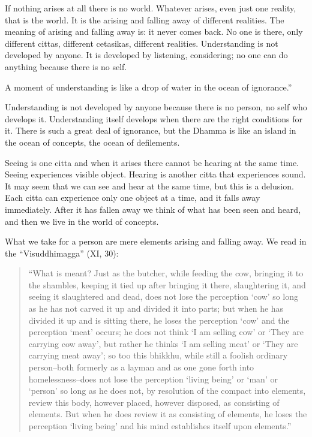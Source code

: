 If nothing arises at all there is no world. Whatever arises, even just
one reality, that is the world. It is the arising and falling away of
different realities. The meaning of arising and falling away is: it
never comes back. No one is there, only different cittas, different
cetasikas, different realities. Understanding is not developed by
anyone. It is developed by listening, considering; no one can do
anything because there is no self.

A moment of understanding is like a drop of water in the ocean of
ignorance.''

Understanding is not developed by anyone because there is no person, no
self who develops it. Understanding itself develops when there are the
right conditions for it. There is such a great deal of ignorance, but
the Dhamma is like an island in the ocean of concepts, the ocean of
defilements.

Seeing is one citta and when it arises there cannot be hearing at the
same time. Seeing experiences visible object. Hearing is another citta
that experiences sound. It may seem that we can see and hear at the same
time, but this is a delusion. Each citta can experience only one object
at a time, and it falls away immediately. After it has fallen away we
think of what has been seen and heard, and then we live in the world of
concepts.

What we take for a person are mere elements arising and falling away. We
read in the ``Visuddhimagga'' (XI, 30):

\begin{quote}

``What is meant? Just as the butcher, while feeding the cow, bringing it
to the shambles, keeping it tied up after bringing it there,
slaughtering it, and seeing it slaughtered and dead, does not lose the
perception `cow' so long as he has not carved it up and divided it into
parts; but when he has divided it up and is sitting there, he loses the
perception `cow' and the perception `meat' occurs; he does not think `I
am selling cow' or `They are carrying cow away', but rather he thinks `I
am selling meat' or `They are carrying meat away'; so too this bhikkhu,
while still a foolish ordinary person--both formerly as a layman and as
one gone forth into homelessness--does not lose the perception `living
being' or `man' or `person' so long as he does not, by resolution of the
compact into elements, review this body, however placed, however
disposed, as consisting of elements. But when he does review it as
consisting of elements, he loses the perception `living being' and his
mind establishes itself upon elements.''

\end{quote}

